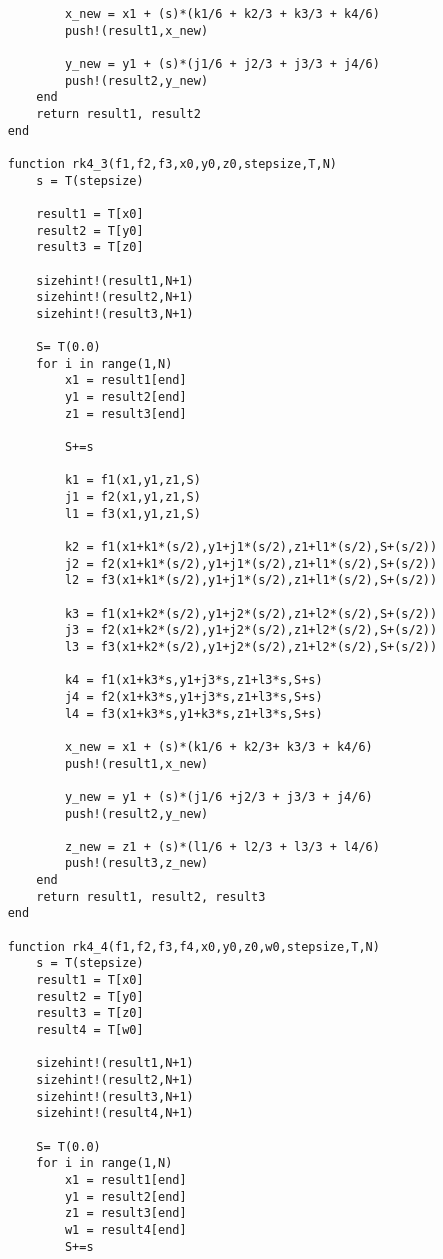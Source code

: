 \begin{lstlisting}
            x_new = x1 + (s)*(k1/6 + k2/3 + k3/3 + k4/6)
            push!(result1,x_new)

            y_new = y1 + (s)*(j1/6 + j2/3 + j3/3 + j4/6)
            push!(result2,y_new)
        end
        return result1, result2
    end

    function rk4_3(f1,f2,f3,x0,y0,z0,stepsize,T,N)
        s = T(stepsize)

        result1 = T[x0]
        result2 = T[y0]
        result3 = T[z0]

        sizehint!(result1,N+1)
        sizehint!(result2,N+1)
        sizehint!(result3,N+1)

        S= T(0.0)
        for i in range(1,N)
            x1 = result1[end]
            y1 = result2[end]
            z1 = result3[end]

            S+=s

            k1 = f1(x1,y1,z1,S)
            j1 = f2(x1,y1,z1,S)
            l1 = f3(x1,y1,z1,S)

            k2 = f1(x1+k1*(s/2),y1+j1*(s/2),z1+l1*(s/2),S+(s/2))
            j2 = f2(x1+k1*(s/2),y1+j1*(s/2),z1+l1*(s/2),S+(s/2))
            l2 = f3(x1+k1*(s/2),y1+j1*(s/2),z1+l1*(s/2),S+(s/2))

            k3 = f1(x1+k2*(s/2),y1+j2*(s/2),z1+l2*(s/2),S+(s/2))
            j3 = f2(x1+k2*(s/2),y1+j2*(s/2),z1+l2*(s/2),S+(s/2))
            l3 = f3(x1+k2*(s/2),y1+j2*(s/2),z1+l2*(s/2),S+(s/2))

            k4 = f1(x1+k3*s,y1+j3*s,z1+l3*s,S+s)
            j4 = f2(x1+k3*s,y1+j3*s,z1+l3*s,S+s)
            l4 = f3(x1+k3*s,y1+k3*s,z1+l3*s,S+s)

            x_new = x1 + (s)*(k1/6 + k2/3+ k3/3 + k4/6)
            push!(result1,x_new)

            y_new = y1 + (s)*(j1/6 +j2/3 + j3/3 + j4/6)
            push!(result2,y_new)

            z_new = z1 + (s)*(l1/6 + l2/3 + l3/3 + l4/6)
            push!(result3,z_new)
        end
        return result1, result2, result3
    end

    function rk4_4(f1,f2,f3,f4,x0,y0,z0,w0,stepsize,T,N)
        s = T(stepsize)
        result1 = T[x0]       
        result2 = T[y0]
        result3 = T[z0]
        result4 = T[w0]

        sizehint!(result1,N+1)
        sizehint!(result2,N+1)
        sizehint!(result3,N+1)
        sizehint!(result4,N+1)

        S= T(0.0)
        for i in range(1,N)
            x1 = result1[end]
            y1 = result2[end]
            z1 = result3[end]
            w1 = result4[end]
            S+=s


\end{lstlisting}
